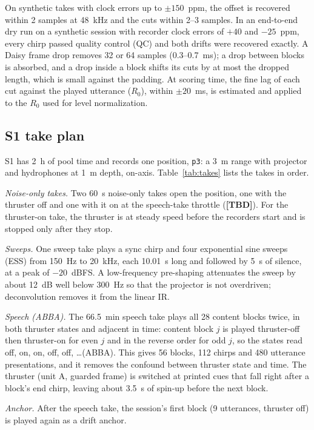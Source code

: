 \documentclass[conference]{IEEEtran}
\newcommand{\tbd}{\textbf{[TBD]}}
\begin{document}
On synthetic takes with clock errors up to $\pm150$~ppm, the offset is recovered within 2 samples at
48~kHz and the cuts within 2--3 samples. In an end-to-end dry run on a synthetic session with recorder
clock errors of $+40$ and $-25$~ppm, every chirp passed quality control (QC) and both drifts were recovered exactly. A
Daisy frame drop removes 32 or 64 samples (0.3--0.7~ms); a drop between blocks is absorbed, and a drop
inside a block shifts its cuts by at most the dropped length, which is small against the padding. At scoring time, the
fine lag of each cut against the played utterance ($R_0$), within $\pm20$~ms, is estimated and applied
to the $R_0$ used for level normalization.

\subsection{S1 take plan}
\label{sec:takes}
S1 has 2~h of pool time and records one position, \texttt{p3}: a 3~m range with projector and
hydrophones at 1~m depth, on-axis. Table~\ref{tab:takes} lists the takes in order.

\textit{Noise-only takes.} Two 60~s noise-only takes open the position, one with the thruster off and
one with it on at the speech-take throttle (\tbd). For the thruster-on take, the thruster is at steady
speed before the recorders start and is stopped only after they stop.

\textit{Sweeps.} One sweep take plays a sync chirp and four exponential sine sweeps (ESS)
\cite{farina2000} from 150~Hz to 20~kHz, each 10.01~s long and followed by 5~s of
silence, at a peak of $-20$~dBFS. A low-frequency pre-shaping attenuates the sweep by about 12~dB well
below 300~Hz so that the projector is not overdriven; deconvolution removes it from the linear IR.

\textit{Speech (ABBA).} The 66.5~min speech take plays all 28 content blocks twice, in both thruster
states and adjacent in time: content block $j$ is played thruster-off then thruster-on for even $j$ and
in the reverse order for odd $j$, so the states read off, on, on, off, off, \ldots (ABBA). This gives
56 blocks, 112 chirps and 480 utterance presentations, and it removes the confound between thruster
state and time. The thruster (unit A, guarded frame) is switched at printed cues that fall right after a
block's end chirp, leaving about 3.5~s of spin-up before the next block.

\textit{Anchor.} After the speech take, the session's first block (9 utterances, thruster off) is
played again as a drift anchor.
\end{document}

